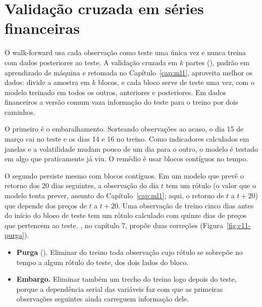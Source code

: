 \section{Validação cruzada em séries financeiras}
\label{sec:c11-cv}

O walk-forward usa cada observação como teste uma única vez e nunca treina com dados posteriores ao teste. A validação cruzada em $k$ partes (), padrão em aprendizado de máquina e retomada no Capítulo~\ref{cap:ml1}, aproveita melhor os dados: divide a amostra em $k$ blocos, e cada bloco serve de teste uma vez, com o modelo treinado em todos os outros, anteriores e posteriores. Em dados financeiros a versão comum vaza informação do teste para o treino por dois caminhos.

O primeiro é o embaralhamento. Sorteando observações ao acaso, o dia 15 de março cai no teste e os dias 14 e 16 no treino. Como indicadores calculados em janelas e a volatilidade mudam pouco de um dia para o outro, o modelo é testado em algo que praticamente já viu. O remédio é usar blocos contíguos no tempo.

O segundo persiste mesmo com blocos contíguos. Em um modelo que prevê o retorno dos 20 dias seguintes, a observação do dia $t$ tem um rótulo (o valor que o modelo tenta prever, assunto do Capítulo~\ref{cap:ml1}; aqui, o retorno de $t$ a $t+20$) que depende dos preços de $t$ a $t+20$. Uma observação de treino cinco dias antes do início do bloco de teste tem um rótulo calculado com quinze dias de preços que pertencem ao teste. \citet{lopezdeprado2018}, no capítulo 7, propõe duas correções (Figura~\ref{fig:c11-purga}).

\begin{itemize}
  \item \textbf{Purga} (). Eliminar do treino toda observação cujo rótulo se sobrepõe no tempo a algum rótulo do teste, dos dois lados do bloco.
  \item \textbf{Embargo.} Eliminar também um trecho do treino logo depois do teste, porque a dependência serial das variáveis faz com que as primeiras observações seguintes ainda carreguem informação dele.
\end{itemize}

